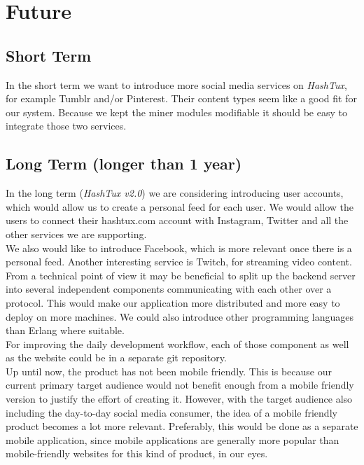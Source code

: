 \hypertarget{future}{
\chapter{Future}}

\section{Short Term}
In the short term we want to introduce more social media services on
\textit{HashTux}, for example Tumblr and/or Pinterest. Their content types seem
like a good fit for our system. Because we kept the miner modules modifiable it
should be easy to integrate those two services.

\section{Long Term (longer than 1 year)}
In the long term (\textit{HashTux v2.0}) we are considering introducing user
accounts, which would allow us to create a personal feed for each user. We would
allow the users to connect their hashtux.com account with Instagram, Twitter and
all the other services we are supporting. \\

We also would like to introduce Facebook, which is more relevant once there is a
personal feed. Another interesting service is Twitch, for streaming video
content. \\

From a technical point of view it may be beneficial to split up the backend
server into several independent components communicating with each other over a
protocol. This would make our application more distributed and more easy to
deploy on more machines. We could also introduce other programming languages
than Erlang where suitable. \\

For improving the daily development workflow, each of those component as well as
the website could be in a separate git repository. \\

Up until now, the product has not been mobile friendly. This is because our
current primary target audience would not benefit enough from a mobile friendly
version to justify the effort of creating it. However, with the target audience
also including the day-to-day social media consumer, the idea of a mobile
friendly product becomes a lot more relevant. Preferably, this would be done as
a separate mobile application, since mobile applications are generally more
popular than mobile-friendly websites for this kind of product, in our eyes.